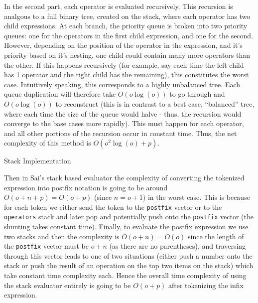 \documentclass[11pt]{article}
\begin{document}
In the second part, each operator is evaluated recursively.
This recursion is analgous to a full binary tree, created on the stack, where each operator has two child expressions.
At each branch, the priority queue is broken into two priority queues: one for the operators in the first child expression, and one for the second.
However, depending on the position of the operator in the expression, and it's priority based on it's nesting, one child could contain many more operators than the other.
If this happens recursively (for example, say each time the left child has 1 operator and the right child has the remaining), this constitutes the worst case.
Intuitively speaking, this corresponds to a highly unbalanced tree.
Each queue duplication will therefore take $O(o\log(o))$ to go through and $O(o\log(o))$ to reconstruct (this is in contrast to a best case, ``balanced'' tree, where each time the size of the queue would halve - thus, the recursion would converge to the base cases more rapidly).
This must happen for each operator, and all other portions of the recursion occur in constant time.
Thus, the net complexity of this method is $O(o^2\log(o) + p)$.

\centerline{Stack Implementation}
Then in Sai's stack based evaluator the complexity of converting the tokenized expression into postfix notation is going to be around $O(o+n+p) = O(o+p)$ (since $n=o+1$) in the worst case.
This is because for each token we either send the token to the \texttt{postfix} vector or to the \texttt{operators} stack and later pop and potentially push onto the \texttt{postfix} vector (the shunting takes constant time).
Finally, to evaluate the postfix expression we use two stacks and then the complexity is $O(o+n) = O(o)$ since the length of the \texttt{postfix} vector must be $o+n$ (as there are no parentheses), and traversing through this vector leads to one of two situations (either push a number onto the stack or push the result of an operation on the top two items on the stack) which take constant time complexity each.
Hence the overall time complexity of using the stack evaluator entirely is going to be $O(o+p)$ after tokenizing the infix expression.
\end{document}

